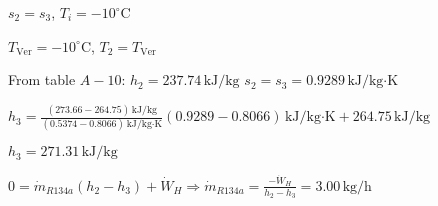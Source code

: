 \( s_2 = s_3 \), \( T_i = -10^\circ \text{C} \)  

\( T_{\text{Ver}} = -10^\circ \text{C} \), \( T_2 = T_{\text{Ver}} \)  

From table \( A-10 \):  
\( h_2 = 237.74 \, \text{kJ/kg} \)  
\( s_2 = s_3 = 0.9289 \, \text{kJ/kg·K} \)  

\( h_3 = \frac{(273.66 - 264.75) \, \text{kJ/kg}}{(0.5374 - 0.8066) \, \text{kJ/kg·K}} (0.9289 - 0.8066) \, \text{kJ/kg·K} + 264.75 \, \text{kJ/kg} \)  

\( h_3 = 271.31 \, \text{kJ/kg} \)  

\( 0 = \dot{m}_{R134a} (h_2 - h_3) + \dot{W}_H \Rightarrow \dot{m}_{R134a} = \frac{-\dot{W}_H}{h_2 - h_3} = 3.00 \, \text{kg/h} \)